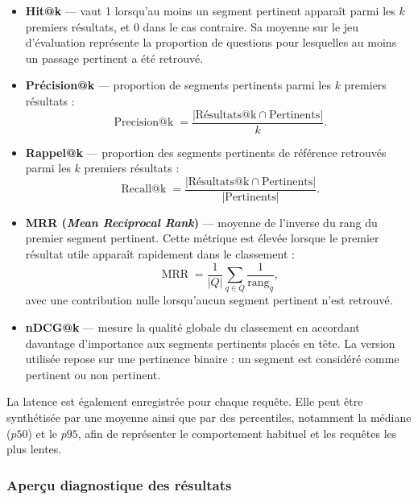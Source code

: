 \begin{itemize}
  \item \textbf{Hit@k} — vaut 1 lorsqu'au moins un segment pertinent apparaît parmi
        les \(k\) premiers résultats, et 0 dans le cas contraire. Sa moyenne sur le
        jeu d'évaluation représente la proportion de questions pour lesquelles au
        moins un passage pertinent a été retrouvé.

  \item \textbf{Précision@k} — proportion de segments pertinents parmi les \(k\)
        premiers résultats :
        \[
          \operatorname{Precision@k}
          =
          \frac{\left|\mathrm{Résultats@k}\cap\mathrm{Pertinents}\right|}{k}.
        \]

  \item \textbf{Rappel@k} — proportion des segments pertinents de référence retrouvés
        parmi les \(k\) premiers résultats :
        \[
          \operatorname{Recall@k}
          =
          \frac{\left|\mathrm{Résultats@k}\cap\mathrm{Pertinents}\right|}
               {\left|\mathrm{Pertinents}\right|}.
        \]

  \item \textbf{MRR (\emph{Mean Reciprocal Rank})} — moyenne de l'inverse du rang du
        premier segment pertinent. Cette métrique est élevée lorsque le premier
        résultat utile apparaît rapidement dans le classement :
        \[
          \operatorname{MRR}
          =
          \frac{1}{|Q|}
          \sum_{q \in Q}
          \frac{1}{\operatorname{rang}_{q}},
        \]
        avec une contribution nulle lorsqu'aucun segment pertinent n'est retrouvé.

  \item \textbf{nDCG@k} — mesure la qualité globale du classement en accordant
        davantage d'importance aux segments pertinents placés en tête. La version
        utilisée repose sur une pertinence binaire : un segment est considéré comme
        pertinent ou non pertinent.
\end{itemize}

La latence est également enregistrée pour chaque requête. Elle peut être synthétisée
par une moyenne ainsi que par des percentiles, notamment la médiane
(\(p50\)) et le \(p95\), afin de représenter le comportement habituel et les requêtes
les plus lentes.

\subsubsection{Aperçu diagnostique des résultats}

